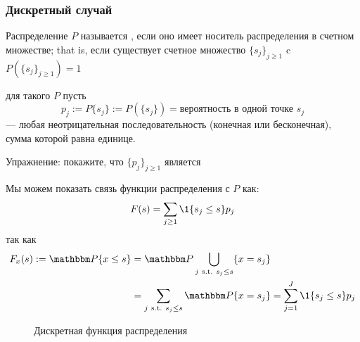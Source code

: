 \begin{frame}\frametitle{Дискретный случай}
    
    \vspace{2em}
    Распределение $P$ называется , если оно имеет носитель распределения в счетном
    множестве; that is, если существует счетное множество $\{s_j\}_{j \geq 1}$ c
    $P(\{s_j\}_{j \geq 1}) = 1$
    
    для такого $P$ пусть
    \begin{equation*}
        p_j 
        := P\{s_j\} 
        := P(\{s_j\})
        = \text{вероятность в одной точке } s_j
    \end{equation*}
     --- любая неотрицательная последовательность 
    (конечная или бесконечная), сумма которой равна единице.
    
    Упражнение: покажите, что $\{p_j\}_{j \geq 1}$ является
    
\end{frame}

\begin{frame}

    \vspace{2em}
    Мы можем показать связь функции распределения с $P$ как:
    \begin{equation}
        \label{eq:cdfdrv}
        F(s) = \sum_{j \geq 1} \1\{s_j \leq s\} p_j
    \end{equation}
    так как
    \begin{align*}
        F_x(s) := 
        \PP\{x \leq s\}
        & = \PP \bigcup_{j \st s_j \leq s} \{x = s_j\}
        \\
        & = \sum_{j \st s_j \leq s} \PP \{x = s_j\} 
        = \sum_{j=1}^J \1\{s_j \leq s\} p_j
    \end{align*}
    
\end{frame}

\begin{frame}

    \begin{figure}
       \begin{center}
        
        \caption{\label{f:discrete_cdf} Дискретная функция распределения}
       \end{center}
    \end{figure}

\end{frame}

